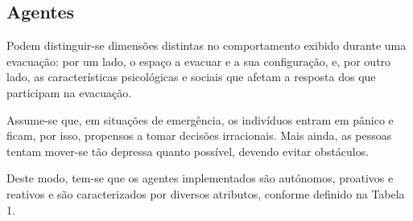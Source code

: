 \documentclass[12pt]{article}
\begin{document}
\begin{titlepage}
\subsection{Agentes}

Podem distinguir-se dimensões distintas no comportamento exibido durante uma evacuação: por um lado, o espaço a evacuar e a sua configuração, e, por outro lado, as características psicológicas e sociais que afetam a resposta dos que participam na evacuação.

Assume-se que, em situações de emergência, os indivíduos entram em pânico e ficam, por isso, propensos a tomar decisões irracionais. Mais ainda, as pessoas tentam mover-se tão depressa quanto possível, devendo evitar obstáculos.

Deste modo, tem-se que os agentes implementados são autónomos, proativos e reativos e são caracterizados por diversos atributos, conforme definido na Tabela 1.


\end{titlepage}
\end{document}
